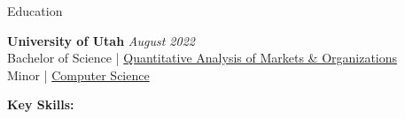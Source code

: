 \documentclass{content/resume/resume}
\begin{document}
\begin{rSection}{Education}

{\bf University of Utah} \hfill {\em August 2022}
\vspace{2pt}
  \\ Bachelor of Science | \href{https://eccles.utah.edu/programs/undergraduate/academics/majors/qamo/}{Quantitative Analysis of Markets \& Organizations}
  \\ Minor | \href{https://github.com/search?o=desc&q=user\%3ASpelkington&s=updated&type=Repositories}{Computer Science}

%
%
%
%
%
%
%   
%
%
%
%

%
%
{\bf Key Skills:}
\vspace{-1.83em}


\end{rSection}
\end{document}
